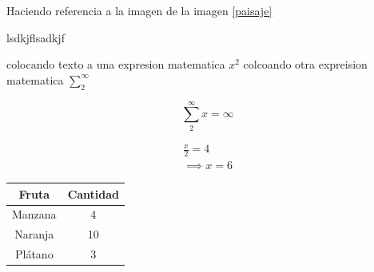 \documentclass[10pt,a4paper]{article}
\begin{document}
Haciendo referencia a la imagen de la imagen \ref{paisaje} 

lsdkjflsadkjf

colocando texto a una expresion matematica  $x^2$
colcoando otra expreision matematica $\sum_2^\infty$

\begin{equation}
	\sum_2^\infty x = \infty
\end{equation}


\begin{gather}
	\frac{x}{2} = 4\\
	\implies x = 6
\end{gather}{}


\begin{tabular}{| c | c |}
\hline
Fruta & Cantidad \\ \hline
Manzana & 4 \\
\hline
Naranja & 10 \\
\hline
Plátano & 3 \\ \hline
\end{tabular}
\end{document}
